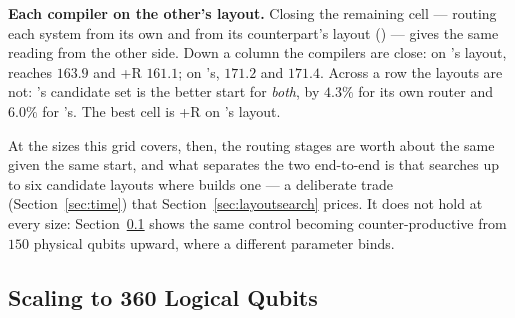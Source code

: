 \textbf{Each compiler on the other's layout.} Closing the remaining
cell --- routing each system from its own and from its counterpart's
layout (\appTables{}) --- gives the same reading from the other side.
Down a column the compilers are close: on \dSABRE{}'s layout,
\dSABRE{} reaches $163.9$ and \PORTER{}+R $161.1$; on \PORTER{}'s,
$171.2$ and $171.4$. Across a row the layouts are not: \dSABRE{}'s
candidate set is the better start for \emph{both}, by $4.3\%$ for its
own router and $6.0\%$ for \PORTER{}'s. The best cell is \PORTER{}+R on
\dSABRE{}'s layout.

At the sizes this grid covers, then, the routing stages are worth about
the same given the same start, and what separates the two end-to-end is
that \dSABRE{} searches up to six candidate layouts where \PORTER{}
builds one --- a deliberate trade (Section~\ref{sec:time}) that
Section~\ref{sec:layoutsearch} prices. It does not hold at every size:
Section~\ref{sec:scaleup} shows the same control becoming
counter-productive from $150$ physical qubits upward, where a different
parameter binds.

\subsection{Scaling to 360 Logical Qubits}
\label{sec:scaleup}

